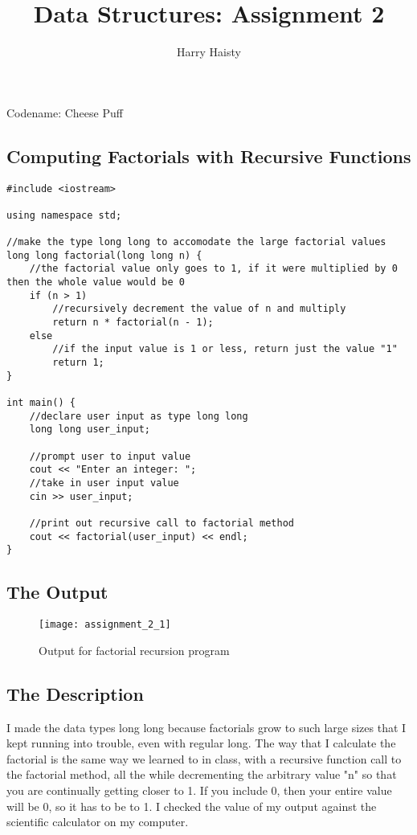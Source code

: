 \documentclass[11pt]{article}
\title{Data Structures: Assignment 2}
\author{Harry Haisty}
\begin{document}
\maketitle
\centerline{Codename: Cheese Puff}

\subsection*{Computing Factorials with Recursive Functions}
\begin{lstlisting}
#include <iostream>

using namespace std;

//make the type long long to accomodate the large factorial values
long long factorial(long long n) {
    //the factorial value only goes to 1, if it were multiplied by 0 then the whole value would be 0
    if (n > 1)
        //recursively decrement the value of n and multiply
        return n * factorial(n - 1);
    else
        //if the input value is 1 or less, return just the value "1"
        return 1;
}

int main() {
    //declare user input as type long long
    long long user_input;

    //prompt user to input value
    cout << "Enter an integer: ";
    //take in user input value
    cin >> user_input;

    //print out recursive call to factorial method
    cout << factorial(user_input) << endl;
}
\end{lstlisting}
\subsection*{The Output}
\begin{figure}[H]
    \centering
    \texttt{[image: assignment\_2\_1]}
    \caption{Output for factorial recursion program}
    \label{fig:part 1}
\end{figure}

\subsection{The Description}
I made the data types long long because factorials grow to such large sizes that I kept running into trouble, even with regular long. The way that I calculate the factorial is the same way we learned to in class, with a recursive function call to the factorial method, all the while decrementing the arbitrary value "n" so that you are continually getting closer to 1. If you include 0, then your entire value will be 0, so it has to be to 1. I checked the value of my output against the scientific calculator on my computer.
\end{document}
